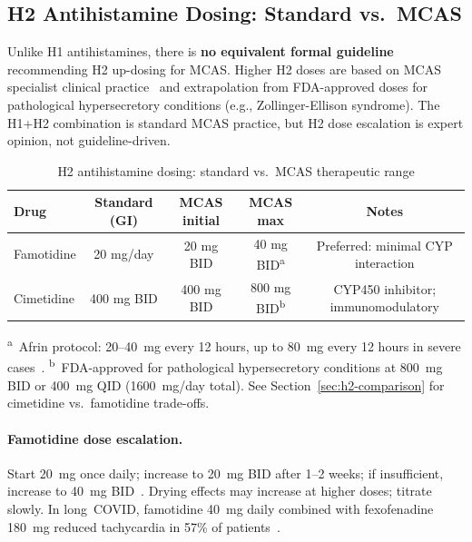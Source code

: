 \subsection{H2 Antihistamine Dosing: Standard vs.\ MCAS}
\label{sec:h2-updosing}

\begin{warning}
Unlike H1 antihistamines, there is \textbf{no equivalent formal guideline} recommending H2 up-dosing for MCAS. Higher H2 doses are based on MCAS specialist clinical practice~\cite{Afrin2013MCAS,Molderings2016pharmacological} and extrapolation from FDA-approved doses for pathological hypersecretory conditions (e.g., Zollinger-Ellison syndrome). The H1+H2 combination is standard MCAS practice, but H2 dose escalation is expert opinion, not guideline-driven.
\end{warning}

\begin{table}[htbp]
\centering
\caption{H2 antihistamine dosing: standard vs.\ MCAS therapeutic range}
\label{tab:h2-updosing}
\begin{tabular}{lcccc}
\toprule
\textbf{Drug} & \textbf{Standard (GI)} & \textbf{MCAS initial} & \textbf{MCAS max} & \textbf{Notes} \\
\midrule
Famotidine & 20 mg/day & 20 mg BID & 40 mg BID\textsuperscript{a} & Preferred: minimal CYP interaction \\
Cimetidine & 400 mg BID & 400 mg BID & 800 mg BID\textsuperscript{b} & CYP450 inhibitor; immunomodulatory \\
\bottomrule
\end{tabular}

\vspace{0.5em}
{\footnotesize
\textsuperscript{a}~Afrin protocol: 20--40~mg every 12 hours, up to 80~mg every 12 hours in severe cases~\cite{Afrin2013MCAS}. \textsuperscript{b}~FDA-approved for pathological hypersecretory conditions at 800~mg BID or 400~mg QID (1600~mg/day total). See Section~\ref{sec:h2-comparison} for cimetidine vs.\ famotidine trade-offs.
}
\end{table}

\paragraph{Famotidine dose escalation.} Start 20~mg once daily; increase to 20~mg BID after 1--2 weeks; if insufficient, increase to 40~mg BID~\cite{Afrin2013MCAS}. Drying effects may increase at higher doses; titrate slowly. In long~COVID, famotidine 40~mg daily combined with fexofenadine 180~mg reduced tachycardia in 57\% of patients~\cite{Salvucci2023antihistamineLongCOVID}.

